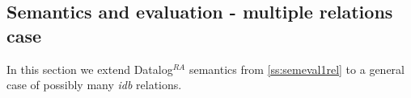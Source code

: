 \documentclass{pracamgr}
\theoremstyle{plain}
\theoremstyle{definition}
\theoremstyle{remark}
\newcommand{\datalogra}{Datalog$^{RA}$ }
\newcommand{\narrow}[1]{\begin{changemargin}{2cm}{2cm} #1 \end{changemargin}}
\begin{document}

\subsection{Semantics and evaluation - multiple relations case}
In this section we extend \datalogra semantics from \ref{ss:semeval1rel} to a general case of possibly many \emph{idb} relations.
\end{document}
